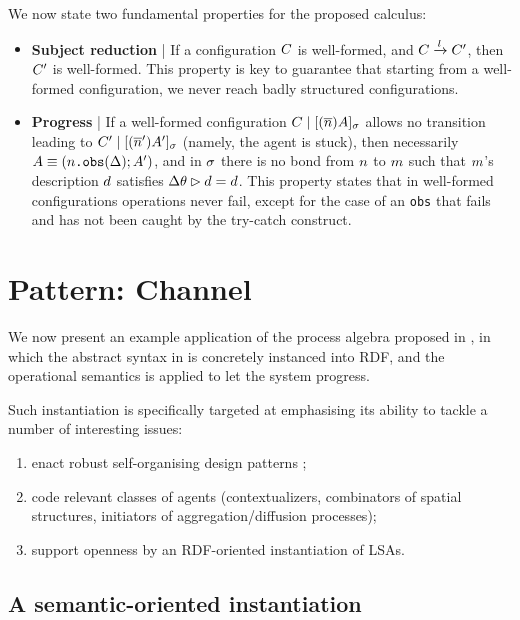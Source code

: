 \documentclass[12pt,a4paper,twoside,openright]{book}
\begin{document}
We now state two fundamental properties for the proposed calculus:
%
\begin{itemize}
 \item \textbf{Subject reduction} | If a configuration $C$ is well-formed, and $C\xrightarrow{l}C'$, then $C'$ is well-formed. This property is key to guarantee that starting from a well-formed configuration, we never reach badly structured configurations.

 \item \textbf{Progress} | If a well-formed configuration $C\;|\;[(\overline{n})A]_{\sigma}$ allows no transition leading to $C'\;|\;[(\overline{n}')A']_{\sigma}$ (namely, the agent is stuck), then necessarily $A\equiv(n\texttt{.obs}(\Delta);A')$, and in $\sigma$ there is no bond from $n$ to $m$ such that $m$'s description $d$ satisfies $\Delta\theta\rhd d=d$. This property states that in well-formed configurations operations never fail, except for the case of an \texttt{obs} that fails and has not been caught by the try-catch construct.
\end{itemize}

\chapter{Pattern: Channel}
\label{pattern-channel}
We now present an example application of the process algebra proposed in , in which the abstract syntax in  is concretely instanced into RDF, and the operational semantics is applied to let the system progress.

Such instantiation is specifically targeted at emphasising its ability to tackle a number of interesting issues:

\begin{enumerate}
 \item enact robust self-organising design patterns \cite{FDMVA-NACO2012};
 \item code relevant classes of agents (contextualizers, combinators of spatial structures, initiators of aggregation/diffusion processes);
 \item support openness by an RDF-oriented instantiation of LSAs.
\end{enumerate}

\section{A semantic-oriented instantiation}
\end{document}
